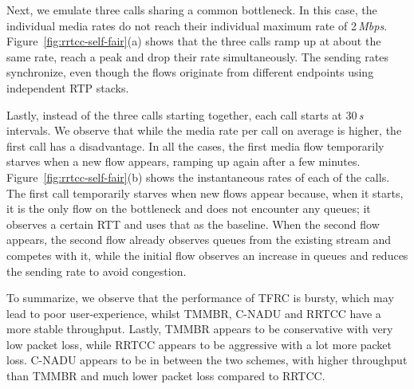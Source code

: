 \begin{table}[!t]
\begin{center}
\end{center}
    \caption{RRTCC competing with similar cross-traffic on the bottleneck link.}
    \label{tab:self-fair}
\end{table}

Next, we emulate three calls sharing a common bottleneck. In this case, the
individual media rates do not reach their individual maximum rate of 2\,\emph{Mbps}.
Figure~\ref{fig:rrtcc-self-fair}(a) shows that the three calls ramp up at about the
same rate, reach a peak and drop their rate simultaneously. The sending rates
synchronize, even though the flows originate from different endpoints using
independent RTP stacks.

Lastly, instead of the three calls starting together, each call starts at 30\,\emph{s}
intervals. We observe that while the media rate per call on average is higher,
the first call has a disadvantage. In all the cases, the first media flow temporarily 
starves when a new flow appears, ramping up again after a few minutes.
Figure~\ref{fig:rrtcc-self-fair}(b) shows the instantaneous rates of each of
the calls. The first call temporarily starves when new flows appear because,
when it starts, it is the only flow on the bottleneck and does not encounter
any queues; it observes a certain RTT and uses that as the baseline. When the
second flow appears, the second flow already observes queues from the existing
stream and competes with it, while the initial flow observes an increase in
queues and reduces the sending rate to avoid congestion.


To summarize, we observe that the performance of TFRC is bursty, which may
lead to poor user-experience, whilst TMMBR, C-NADU and RRTCC have a more
stable throughput. Lastly, TMMBR appears to be conservative with very low
packet loss, while RRTCC appears to be aggressive with a lot more packet loss.
C-NADU appears to be in between the two schemes, with higher throughput than
TMMBR and much lower packet loss compared to RRTCC. 

